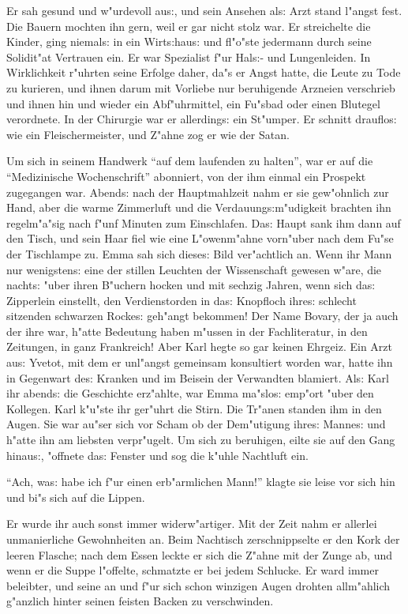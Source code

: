 \documentclass[oneside,12pt]{book}
\newcommand{\s}{s:}%
\begin{document}
Er sah gesund und w"urdevoll au{\s}, und sein Ansehen al{\s} Arzt
stand l"angst fest. Die Bauern mochten ihn gern, weil er gar nicht
stolz war. Er streichelte die Kinder, ging niemal{\s} in ein
Wirt{\s}hau{\s} und fl"o"ste jedermann durch seine Solidit"at
Vertrauen ein. Er war Spezialist f"ur Hal{\s}- und Lungenleiden.
In Wirklichkeit r"uhrten seine Erfolge daher, da"s er Angst hatte,
die Leute zu Tode zu kurieren, und ihnen darum mit Vorliebe nur
beruhigende Arzneien verschrieb und ihnen hin und wieder ein
Abf"uhrmittel, ein Fu"sbad oder einen Blutegel verordnete. In der
Chirurgie war er allerding{\s} ein St"umper. Er schnitt
drauflo{\s} wie ein Fleischermeister, und Z"ahne zog er wie der
Satan.

Um sich in seinem Handwerk "`auf dem laufenden zu halten"', war er
auf die "`Medizinische Wochenschrift"' abonniert, von der ihm
einmal ein Prospekt zugegangen war. Abend{\s} nach der
Hauptmahlzeit nahm er sie gew"ohnlich zur Hand, aber die warme
Zimmerluft und die Verdauung{\s}m"udigkeit brachten ihn
regelm"a"sig nach f"unf Minuten zum Einschlafen. Da{\s} Haupt sank
ihm dann auf den Tisch, und sein Haar fiel wie eine L"owenm"ahne
vorn"uber nach dem Fu"se der Tischlampe zu. Emma sah sich
diese{\s} Bild ver"achtlich an. Wenn ihr Mann nur wenigsten{\s}
eine der stillen Leuchten der Wissenschaft gewesen w"are, die
nacht{\s} "uber ihren B"uchern hocken und mit sechzig Jahren, wenn
sich da{\s} Zipperlein einstellt, den Verdienstorden in da{\s}
Knopfloch ihre{\s} schlecht sitzenden schwarzen Rocke{\s} geh"angt
bekommen! Der Name Bovary, der ja auch der ihre war, h"atte
Bedeutung haben m"ussen in der Fachliteratur, in den Zeitungen, in
ganz Frankreich! Aber Karl hegte so gar keinen Ehrgeiz. Ein Arzt
au{\s} Yvetot, mit dem er unl"angst gemeinsam konsultiert worden
war, hatte ihn in Gegenwart de{\s} Kranken und im Beisein der
Verwandten blamiert. Al{\s} Karl ihr abend{\s} die Geschichte
erz"ahlte, war Emma ma"slo{\s} emp"ort "uber den Kollegen. Karl
k"u"ste ihr ger"uhrt die Stirn. Die Tr"anen standen ihm in den
Augen. Sie war au"ser sich vor Scham ob der Dem"utigung ihre{\s}
Manne{\s} und h"atte ihn am liebsten verpr"ugelt. Um sich zu
beruhigen, eilte sie auf den Gang hinau{\s}, "offnete da{\s}
Fenster und sog die k"uhle Nachtluft ein.

"`Ach, wa{\s} habe ich f"ur einen erb"armlichen Mann!"' klagte sie
leise vor sich hin und bi"s sich auf die Lippen.

Er wurde ihr auch sonst immer widerw"artiger. Mit der Zeit nahm er
allerlei unmanierliche Gewohnheiten an. Beim Nachtisch
zerschnippselte er den Kork der leeren Flasche; nach dem Essen
leckte er sich die Z"ahne mit der Zunge ab, und wenn er die Suppe
l"offelte, schmatzte er bei jedem Schlucke. Er ward immer
beleibter, und seine an und f"ur sich schon winzigen Augen drohten
allm"ahlich g"anzlich hinter seinen feisten Backen zu
verschwinden.
\end{document}
